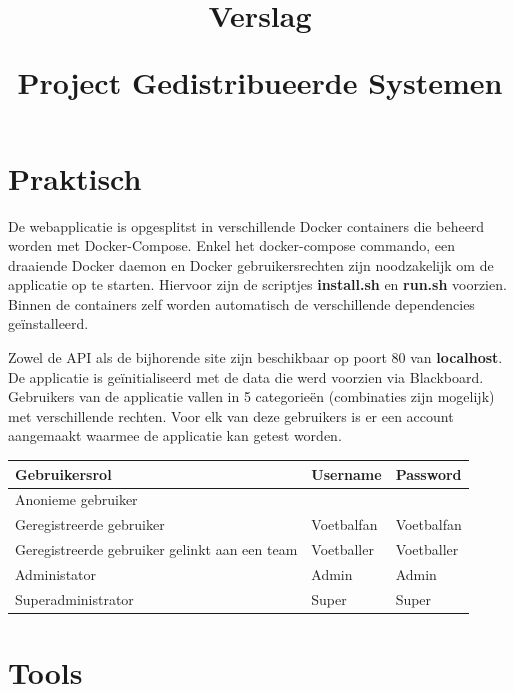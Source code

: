 \documentclass[10pt]{article}
\title{Verslag

\Large Project Gedistribueerde Systemen}
\begin{document}
\maketitle

\vfill
\tableofcontents
\vfill
\clearpage

\section{Praktisch}
De webapplicatie is opgesplitst in verschillende Docker containers die beheerd worden met Docker-Compose. Enkel het docker-compose commando, een draaiende Docker daemon en Docker gebruikersrechten zijn noodzakelijk om de applicatie op te starten. Hiervoor zijn de scriptjes \textbf{install.sh} en \textbf{run.sh} voorzien.
Binnen de containers zelf worden automatisch de verschillende dependencies geïnstalleerd.

\noindent Zowel de API als de bijhorende site zijn beschikbaar op poort 80 van \textbf{localhost}.
De applicatie is geïnitialiseerd met de data die werd voorzien via Blackboard.
Gebruikers van de applicatie vallen in 5 categorieën (combinaties zijn mogelijk) met verschillende rechten. Voor elk van deze gebruikers is er een account aangemaakt waarmee de applicatie kan getest worden.

\begin{xltabular}{\linewidth}{|l|l|l|}
	\hline
	\textbf{Gebruikersrol} & \textbf{Username} & \textbf{Password}\\
	\hline
	Anonieme gebruiker &&\\
	\hline
	Geregistreerde gebruiker & Voetbalfan & Voetbalfan\\
	\hline
	Geregistreerde gebruiker gelinkt aan een team & Voetballer & Voetballer\\
	\hline
	Administator & Admin & Admin\\
	\hline
	Superadministrator & Super & Super\\
	\hline
\end{xltabular}

\clearpage
\section{Tools}
\end{document}
